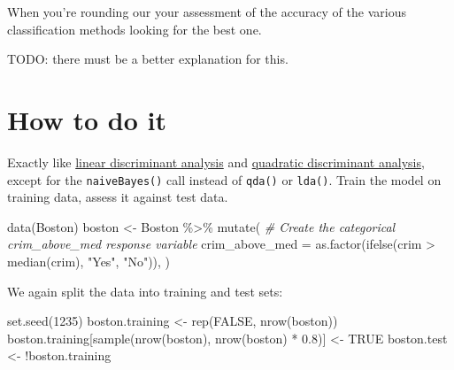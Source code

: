 \documentclass[
]{book}
\newenvironment{Shaded}{\begin{snugshade}}{\end{snugshade}}
\newcommand{\AttributeTok}[1]{\textcolor[rgb]{0.77,0.63,0.00}{#1}}
\newcommand{\CommentTok}[1]{\textcolor[rgb]{0.56,0.35,0.01}{\textit{#1}}}
\newcommand{\ConstantTok}[1]{\textcolor[rgb]{0.00,0.00,0.00}{#1}}
\newcommand{\DecValTok}[1]{\textcolor[rgb]{0.00,0.00,0.81}{#1}}
\newcommand{\FloatTok}[1]{\textcolor[rgb]{0.00,0.00,0.81}{#1}}
\newcommand{\FunctionTok}[1]{\textcolor[rgb]{0.00,0.00,0.00}{#1}}
\newcommand{\NormalTok}[1]{#1}
\newcommand{\OtherTok}[1]{\textcolor[rgb]{0.56,0.35,0.01}{#1}}
\newcommand{\SpecialCharTok}[1]{\textcolor[rgb]{0.00,0.00,0.00}{#1}}
\newcommand{\StringTok}[1]{\textcolor[rgb]{0.31,0.60,0.02}{#1}}
\begin{document}
When you're rounding our your assessment of the accuracy of the various classification methods looking for the best one.

TODO: there must be a better explanation for this.

\hypertarget{how-to-do-it-5}{%
\section{How to do it}\label{how-to-do-it-5}}

Exactly like \protect\hyperlink{linear-discriminant-analysis}{linear discriminant analysis} and \protect\hyperlink{quadratic-discriminant-analysis}{quadratic discriminant analysis}, except for the \texttt{naiveBayes()} call instead of \texttt{qda()} or \texttt{lda()}. Train the model on training data, assess it against test data.

\begin{Shaded}
\begin{Highlighting}[]
\FunctionTok{data}\NormalTok{(Boston)}
\NormalTok{boston }\OtherTok{\textless{}{-}}\NormalTok{ Boston }\SpecialCharTok{\%\textgreater{}\%}
  \FunctionTok{mutate}\NormalTok{(}
    \CommentTok{\# Create the categorical crim\_above\_med response variable}
    \AttributeTok{crim\_above\_med =} \FunctionTok{as.factor}\NormalTok{(}\FunctionTok{ifelse}\NormalTok{(crim }\SpecialCharTok{\textgreater{}} \FunctionTok{median}\NormalTok{(crim), }\StringTok{"Yes"}\NormalTok{, }\StringTok{"No"}\NormalTok{)),}
\NormalTok{  )}
\end{Highlighting}
\end{Shaded}

We again split the data into training and test sets:

\begin{Shaded}
\begin{Highlighting}[]
\FunctionTok{set.seed}\NormalTok{(}\DecValTok{1235}\NormalTok{)}
\NormalTok{boston.training }\OtherTok{\textless{}{-}} \FunctionTok{rep}\NormalTok{(}\ConstantTok{FALSE}\NormalTok{, }\FunctionTok{nrow}\NormalTok{(boston))}
\NormalTok{boston.training[}\FunctionTok{sample}\NormalTok{(}\FunctionTok{nrow}\NormalTok{(boston), }\FunctionTok{nrow}\NormalTok{(boston) }\SpecialCharTok{*} \FloatTok{0.8}\NormalTok{)] }\OtherTok{\textless{}{-}} \ConstantTok{TRUE}
\NormalTok{boston.test }\OtherTok{\textless{}{-}} \SpecialCharTok{!}\NormalTok{boston.training}
\end{Highlighting}
\end{Shaded}
\end{document}
